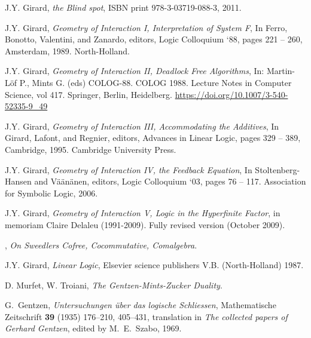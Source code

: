 \documentclass[12pt]{article}
\theoremstyle{plain}
\theoremstyle{definition}
\begin{document}
\begin{thebibliography}{99}
 J.Y. Girard, \emph{the Blind spot}, ISBN print 978-3-03719-088-3, 2011.

 J.Y. Girard, \emph{Geometry of Interaction I, Interpretation of System F}, In Ferro, Bonotto, Valentini, and Zanardo, editors, Logic Colloquium ‘88, pages 221 – 260, Amsterdam, 1989. North-Holland.

 J.Y. Girard, \emph{Geometry of Interaction II, Deadlock Free Algorithms}, In: Martin-Löf P., Mints G. (eds) COLOG-88. COLOG 1988. Lecture Notes in Computer Science, vol 417. Springer, Berlin, Heidelberg. \url{https://doi.org/10.1007/3-540-52335-9_49}

 J.Y. Girard, \emph{Geometry of Interaction III, Accommodating the Additives}, In Girard, Lafont, and Regnier, editors, Advances in Linear Logic, pages 329 – 389, Cambridge, 1995. Cambridge University Press.

 J.Y. Girard, \emph{Geometry of Interaction IV, the Feedback Equation}, In Stoltenberg-Hansen and Väänänen, editors, Logic Colloquium ‘03, pages 76 – 117. Association for Symbolic Logic, 2006.

 J.Y. Girard, \emph{Geometry of Interaction V, Logic in the Hyperfinite Factor}, in memoriam Claire Delaleu (1991-2009). Fully revised version (October 2009).

, \emph{On Sweedlers Cofree, Cocommutative, Comalgebra}.

 J.Y. Girard, \emph{Linear Logic}, Elsevier science publishers V.B. (North-Holland) 1987.

 D. Murfet, W. Troiani, \emph{The Gentzen-Mints-Zucker Duality}.

G.~Gentzen, \textsl{Untersuchungen \"uber das logische Schliessen}, Mathematische Zeitschrift \textbf{39} (1935) 176--210, 405--431, translation in \textsl{The collected papers of Gerhard Gentzen}, edited by M.~E.~Szabo, 1969.

\end{thebibliography}
\end{document}
